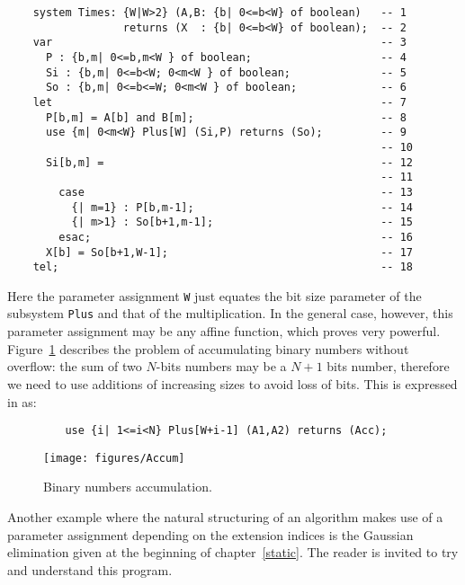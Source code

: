 \begin{verbatim}
    system Times: {W|W>2} (A,B: {b| 0<=b<W} of boolean)   -- 1  
                  returns (X  : {b| 0<=b<W} of boolean);  -- 2  
    var                                                   -- 3  
      P : {b,m| 0<=b,m<W } of boolean;                    -- 4  
      Si : {b,m| 0<=b<W; 0<m<W } of boolean;              -- 5  
      So : {b,m| 0<=b<=W; 0<m<W } of boolean;             -- 6  
    let                                                   -- 7  
      P[b,m] = A[b] and B[m];                             -- 8  
      use {m| 0<m<W} Plus[W] (Si,P) returns (So);         -- 9   
                                                          -- 10 
      Si[b,m] =                                           -- 12 
                                                          -- 11
        case                                              -- 13 
          {| m=1} : P[b,m-1];                             -- 14 
          {| m>1} : So[b+1,m-1];                          -- 15 
        esac;                                             -- 16 
      X[b] = So[b+1,W-1];                                 -- 17 
    tel;                                                  -- 18 
\end{verbatim}


Here the parameter assignment \texttt{W} just equates the bit size
parameter of the subsystem \texttt{Plus} and that of the
multiplication. In the general case, however, this parameter
assignment may be any affine function, which proves very
powerful. Figure~\ref{accumdraw} describes the problem of accumulating
binary numbers without overflow: the sum of two $N$-bits numbers may
be a $N+1$ bits number, therefore we need to use additions of
increasing sizes to avoid loss of bits. This is expressed in {\alfa} as:
\begin{verbatim}
         use {i| 1<=i<N} Plus[W+i-1] (A1,A2) returns (Acc);
\end{verbatim}
\begin{figure}[!ht]
\centerline{
   \texttt{[image: figures/Accum]}
    }
\caption{Binary numbers accumulation. \label{accumdraw} }
\end{figure}

Another example where the natural structuring of an algorithm
makes use of a parameter assignment depending on the extension indices
is the Gaussian elimination given at the beginning of
chapter~\ref{static}. The reader is invited to try and understand this
program.

